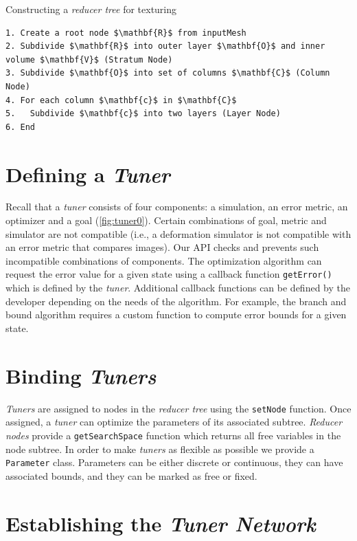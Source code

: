 \begin{algorithm}
\caption{Constructing a \emph{reducer tree} for texturing}
\label{alg:ReducerTree}
\begin{lstlisting}[mathescape=true]
1. Create a root node $\mathbf{R}$ from inputMesh 
2. Subdivide $\mathbf{R}$ into outer layer $\mathbf{O}$ and inner volume $\mathbf{V}$ (Stratum Node) 
3. Subdivide $\mathbf{O}$ into set of columns $\mathbf{C}$ (Column Node) 
4. For each column $\mathbf{c}$ in $\mathbf{C}$ 
5.   Subdivide $\mathbf{c}$ into two layers (Layer Node) 
6. End 
\end{lstlisting}
\end{algorithm}

\section{Defining a \emph{Tuner}}
Recall that a \emph{tuner} consists of four components: a simulation, an error metric, an optimizer and a goal (\autoref{fig:tuner0}). Certain combinations of goal, metric and simulator are not compatible (i.e., a deformation simulator is not compatible with an error metric that compares images). Our API checks and prevents such incompatible combinations of components.  The optimization algorithm can request the error value for a given state using a callback function \verb|getError()| which is defined by the \emph{tuner}. Additional callback functions can be defined by the developer depending on the needs of the algorithm. For example, the branch and bound algorithm requires a custom  function to compute error bounds for a given state.

\section{Binding \emph{Tuners}}

\emph{Tuners} are assigned to nodes in the \emph{reducer tree} using the \verb|setNode| function. Once assigned, a \emph{tuner} can optimize the parameters of its associated subtree. \emph{Reducer nodes} provide a \verb|getSearchSpace| function which returns all free variables in the node subtree. In order to make \emph{tuners} as flexible as possible we provide a \verb|Parameter| class. Parameters can be either discrete or continuous, they can have associated bounds, and they can be marked as free or fixed.

\section{Establishing the \emph{Tuner Network}}


